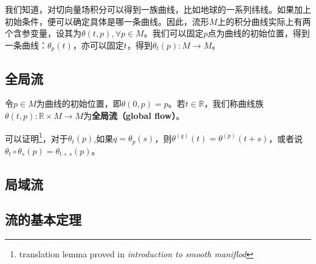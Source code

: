 我们知道，对切向量场积分可以得到一族曲线，比如地球的一系列纬线。如果加上初始条件，便可以确定具体是哪一条曲线。因此，流形$M$上的积分曲线实际上有两个含参变量，设其为$\theta(t,p),\forall p\in M$。我们可以固定$p$点为曲线的初始位置，得到一条曲线：$\theta_p(t)$，亦可以固定$t$，得到$\theta_t(p):M\rightarrow M$。
\subsection{全局流}
令$p\in M$为曲线的初始位置，即$\theta(0,p)=p$。若$t\in\mathbb R$，我们称曲线族$\theta(t,p):\mathbb R\times M\rightarrow M$为\textbf{全局流（global flow）}。

可以证明\footnote{translation lemma proved in \textsl{introduction to smooth maniflod}}，对于$\theta_t(p)$,如果$q=\theta_p(s)$，则$\theta^{(q)}(t)=\theta^{(p)}(t+s)$，或者说$\theta_t \circ \theta_s(p)=\theta_{t+s}(p)$。
\subsection{局域流}
\subsection{流的基本定理}
